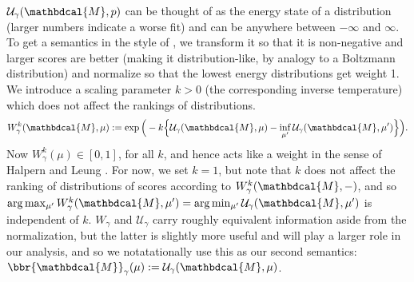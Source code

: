 \documentclass{article}
\theoremstyle{plain}
\theoremstyle{definition}
\theoremstyle{remark}
\newcommand{\dg}[1]{\mathbdcal{#1}}
\numberwithin{equation}{section}
\begin{document}
{$\mathcal U_\gamma(\dg M, p)$ can be thought of as the energy state of
        a distribution (larger numbers indicate a worse fit) and can
        be anywhere between $-\infty$ and $\infty$.
        To get a semantics in the style of \cite{halpern2015weighted},
        we transform it so that it is non-negative and larger scores
        are better (making it distribution-like, by analogy to a
        Boltzmann distribution) and normalize so that the lowest
        energy distributions get weight 1. We introduce a scaling
        parameter $k > 0$ (the corresponding inverse temperature)
       which does not affect the rankings of distributions. 
       \[ W^k_\gamma(\dg M, \mu) := \exp\Big(  -k \Big\{\mathcal U_{\gamma}(\dg M,\mu)- \inf_{\mu'} \mathcal U_\gamma(\dg M,\mu')\Big\} \Big).\]
Now 
$W^k_\gamma(\mu) \in  [0,1]$, for all $k$, and hence acts like a weight in the sense of  Halpern and Leung \citeyear{halpern2015weighted}.
For now, we set $k=1$, but note that $k$ does not affect the ranking of distributions of scores according to $W^k_\gamma(\dg M, -)$, and so $\arg\max_{\mu'} W^k_\gamma(\dg M, \mu')  = \arg\min_{\mu'} \mathcal U_\gamma(\dg M,\mu')$ is independent of $k$. 
%
$W_\gamma$ and $\mathcal U_\gamma$ carry roughly equivalent information aside from the normalization, but the latter is slightly more useful and will play a larger role in our analysis, and so we notatationally use this as our second semantics: $\bbr{\dg M}_\gamma(\mu) := \mathcal U_\gamma(\dg M, \mu)$.
}
\end{document}
